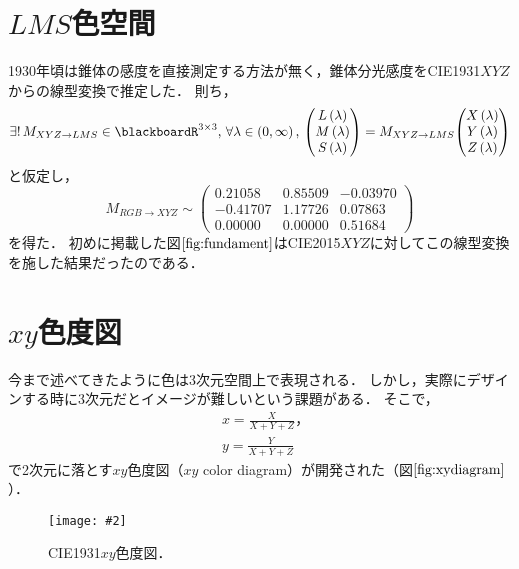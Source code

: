 \documentclass[uplatex,paper=a4,fontsize=4.0truemm,jafontsize=4.0truemm,head_space=30.0truemm,foot_space=30.0truemm,baselineskip=8.0truemm,line_length=40zw,gutter=25.0truemm,oneside,openany,fleqn,hanging_panctuation,open_bracket_pos=nibu_tentsuki,dvipdfmx,jis2004,book,titlepage]{jlreq}
\theoremstyle{mystyle}
\newcommand{\captiondot}[1]{\caption{#1．}}
\newcommand{\figureinput}[4]{\begin{figure}[btp]\centering\texttt{[image: \#2]}\captiondot{#3}\label{fig:#4}\end{figure}}
\newcommand{\mathdisplaystyle}[1]{\(\displaystyle{#1}\)}
\newcommand{\Reference}[1]{\mathdisplaystyle{\ref{#1}}}
\newcommand{\negativevalue}[1]{{-#1}}
\newcommand{\fraction}[2]{\displaystyle{\frac{\displaystyle{#1}}{\displaystyle{#2}}}}
\newcommand{\mathcomma}{\mathpunct{,\,}}
\newcommand{\parentheses}[1]{\left(#1\right)}
\newcommand{\easymatrix}[1]{\mathord{\begin{pmatrix}#1\end{pmatrix}}}
\begin{document}
		\section{\mathdisplaystyle{LMS}色空間}
			1930年頃は錐体の感度を直接測定する方法が無く，錐体分光感度をCIE1931\mathdisplaystyle{XYZ}からの線型変換で推定した．
			則ち，
			\begin{equation*}
				\exists!\,{M_{XYZ\to LMS}\in\blackboardR^{3\times3}}\mathcomma\forall\lambda\in\parentheses{0,\infty}\mathcomma\easymatrix{L\parentheses{\lambda} \\ M\parentheses{\lambda} \\ S\parentheses{\lambda}}=M_{XYZ\to LMS}\easymatrix{X\parentheses{\lambda} \\ Y\parentheses{\lambda} \\ Z\parentheses{\lambda}}
			\end{equation*}
			と仮定し，
			\begin{equation*}
				M_{RGB\to XYZ}\sim\easymatrix{0.21058 & 0.85509 & \negativevalue{0.03970} \\ \negativevalue{0.41707} & 1.17726 & 0.07863 \\ 0.00000 & 0.00000 & 0.51684}
			\end{equation*}
			を得た．
			初めに掲載した図\Reference{fig:fundament}はCIE2015\mathdisplaystyle{XYZ}に対してこの線型変換を施した結果だったのである．
		\section{\mathdisplaystyle{xy}色度図}
			今まで述べてきたように色は3次元空間上で表現される．
			しかし，実際にデザインする時に3次元だとイメージが難しいという課題がある．
			そこで，\begin{align*}
				&x=\fraction{X}{X+Y+Z}\textrm{，}\\
				&y=\fraction{Y}{X+Y+Z}
			\end{align*}
			で2次元に落とす\mathdisplaystyle{xy}色度図（\mathdisplaystyle{xy} color diagram）が開発された（図\Reference{fig:xydiagram}）．
			\figureinput{width=\linewidth}{D:/a/figs/xy.png}{CIE1931\mathdisplaystyle{xy}色度図}{xydiagram}
\end{document}
